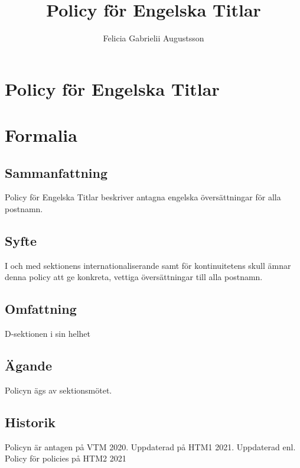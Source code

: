 \documentclass{dsekkallelse}
\title{Policy för Engelska Titlar}
\author{Felicia Gabrielii Augustsson}
\begin{document}
\section{Policy för Engelska Titlar}
\section{Formalia}
\subsection{Sammanfattning}
Policy för Engelska Titlar beskriver antagna engelska översättningar för alla postnamn.
\subsection{Syfte}
I och med sektionens internationaliserande samt för kontinuitetens skull ämnar denna policy att ge konkreta, vettiga översättningar till alla postnamn.
\subsection{Omfattning}
D-sektionen i sin helhet
\subsection{Ägande}
Policyn ägs av sektionsmötet.

\subsection{Historik}
Policyn är antagen på VTM 2020.
Uppdaterad på HTM1 2021.
Uppdaterad enl. Policy för policies på HTM2 2021
\end{document}
